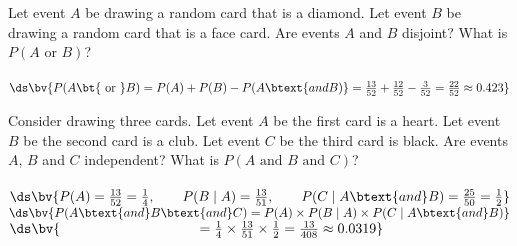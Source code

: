 \documentclass{article}
\begin{document}
\begin{flushleft}
\begin{enumalpha}
\vspace{.5in}
\item Let event $A$ be drawing a random card that is a diamond. Let event $B$ be drawing a random card that is a face card. Are events $A$ and $B$ disjoint? What is $P(A \text{ or } B)$?\\
\medskip
{}\\
\medskip $\ds \bv{P(A \text{\bt{ or }} B) = P(A) + P(B) - P(A \btext{ and B)} =  \frac {13}{52} + \frac {12}{52} - \frac {3}{52} = \frac {22}{52} \approx 0.423}$
\vspace{.5in}
\newpage
\item Consider drawing three cards. Let event $A$ be the first card is a heart. Let event $B$ be the second card is a club. Let event $C$ be the third card is black. Are events $A$, $B$ and $C$ independent? What is $P(A \text { and } B \text { and } C)$?\\
\medskip
{}\\
\bigskip
$\ds \bv{P(A) = \frac {13}{52} = \frac 1 4, \qquad P(B \mid A) = \frac {13}{51}, \qquad P(C \mid A \btext{ and } B) = \frac {25}{50} = \frac 1 2}$\\
\bigskip
$\ds \bv{P(A \btext{ and } B \btext{ and } C) = P(A) \times P(B \mid A) \times P(C \mid A \btext{ and } B)}$\\
\medskip
$\ds \bv{ \qquad \qquad \qquad \qquad \qquad= \frac 1 4 \times \frac {13}{51} \times \frac 1 2 = \frac {13}{408} \approx 0.0319}$

\end{enumalpha}

\newpage

\end{flushleft}
\end{document}
